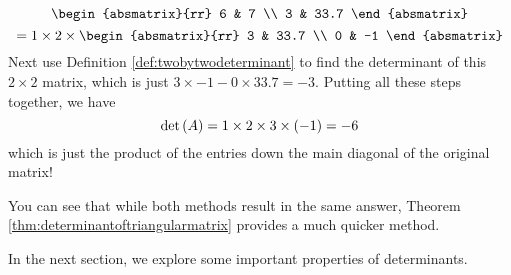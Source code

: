 \begin{solution}
\begin{equation*}
{\begin{absmatrix}{rr}
6 & 7 \\
3 & 33.7
\end{absmatrix} }
\end{equation*}
\begin{equation*}
=1\times 2\times \begin{absmatrix}{rr}
3 & 33.7 \\
0 & -1
\end{absmatrix}
\end{equation*}
Next use Definition \ref{def:twobytwodeterminant} to find the determinant of this $2 \times 2$ matrix, which is
just $3 \times -1  - 0 \times 33.7 = -3$.
Putting all these steps together, we have 
\begin{equation*}
\det \left(A\right)
=
1\times 2\times 3\times \left(-1\right) =-6
\end{equation*}
which is just the product of the entries down the main diagonal of the
original matrix!
\end{solution}

You can see that while both methods result in the same answer, Theorem \ref{thm:determinantoftriangularmatrix} provides
a much quicker method. 

In the next section, we explore some important properties of determinants.